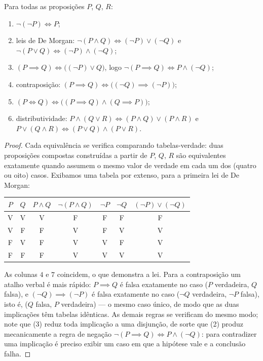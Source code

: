 \begin{proposition}\label{prop:b1:logic:rules}
Para todas as proposições $P$, $Q$, $R$:
\begin{enumerate}
  \item $\lnot(\lnot P) \iff P$;
  \item leis de De Morgan:
        $\lnot(P \land Q) \iff (\lnot P) \lor (\lnot Q)$ e
        $\lnot(P \lor Q) \iff (\lnot P) \land (\lnot Q)$;
  \item $(P \implies Q) \iff \bigl((\lnot P) \lor Q\bigr)$, logo
        $\lnot(P \implies Q) \iff P \land (\lnot Q)$;
  \item contraposição:
        $(P \implies Q) \iff \bigl((\lnot Q) \implies (\lnot P)\bigr)$;
  \item $(P \iff Q) \iff \bigl((P \implies Q) \land (Q \implies
        P)\bigr)$;
  \item distributividade: $P \land (Q \lor R) \iff (P \land Q) \lor
        (P \land R)$ e $P \lor (Q \land R) \iff (P \lor Q) \land
        (P \lor R)$.
\end{enumerate}
\end{proposition}

\begin{proof}
Cada equivalência se verifica comparando tabelas-verdade: duas proposições
compostas construídas a partir de $P$, $Q$, $R$ são equivalentes exatamente
quando assumem o mesmo valor de verdade em cada um dos (quatro ou oito)
casos. Exibamos uma tabela por extenso, para a primeira lei de De Morgan:
\begin{center}
\begin{tabular}{cc|c|c|cc|c}
$P$ & $Q$ & $P \land Q$ & $\lnot(P \land Q)$ & $\lnot P$ & $\lnot Q$ &
$(\lnot P) \lor (\lnot Q)$ \\
\hline
V & V & V & F & F & F & F \\
V & F & F & V & F & V & V \\
F & V & F & V & V & F & V \\
F & F & F & V & V & V & V \\
\end{tabular}
\end{center}
As colunas $4$ e $7$ coincidem, o que demonstra a lei. Para a contraposição
um atalho verbal é mais rápido: $P \implies Q$ é falsa exatamente no
caso ($P$ verdadeira, $Q$ falsa), e $(\lnot Q) \implies (\lnot P)$ é falsa
exatamente no caso ($\lnot Q$ verdadeira, $\lnot P$ falsa), isto é, ($Q$
falsa, $P$ verdadeira) --- o mesmo caso único, de modo que as duas
implicações têm tabelas idênticas. As demais regras se verificam do mesmo
modo; note que (3) reduz toda implicação a uma disjunção, de sorte que (2)
produz mecanicamente a regra de negação $\lnot(P \implies Q) \iff P
\land (\lnot Q)$: para contradizer uma implicação é preciso exibir um caso
em que a hipótese vale e a conclusão falha.
\end{proof}

